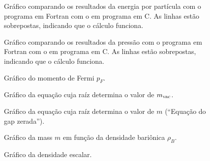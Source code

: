 \begin{figure}
	
	\caption{Gráfico comparando os resultados da energia por partícula com o programa em Fortran com o em programa em C. As linhas estão sobrepostas, indicando que o cálculo funciona. \protect}
	\label{Fig:energy_Comp_C_F}
\end{figure}

\begin{figure}
	
	\caption{Gráfico comparando os resultados da pressão com o programa em Fortran com o em programa em C. As linhas estão sobrepostas, indicando que o cálculo funciona. \protect}
	\label{Fig:pressure_Comp_C_F}
\end{figure}

\FloatBarrier


\begin{figure}
	
	\caption{Gráfico do momento de Fermi $p_F$. \protect}
	\label{Fig:fermi_momentum_NJL-Buballa_Set_1}
\end{figure}

\begin{figure}
	
	\caption{Gráfico da equação cuja raíz determina o valor de $m_{\rm{vac}}$. \protect}
	\label{Fig:vacuum_mass_equation_NJL-Buballa_Set_1}
\end{figure}

\begin{figure}
	
	\caption{Gráfico da equação cuja raíz determina o valor de $m$ (``Equação do gap zerada''). \protect}
	\label{Fig:gap_NJL-Buballa_Set_1}
\end{figure}

\begin{figure}
	
	\caption{Gráfico da mass $m$ em função da densidade bariônica $\rho_B$. \protect}
	\label{Fig:mass_NJL-Buballa_Set_1}
\end{figure}


\begin{figure}
	
	\caption{Gráfico da densidade escalar. \protect}
	\label{Fig:scalar_density_NJL-Buballa_Set_1}
\end{figure}

